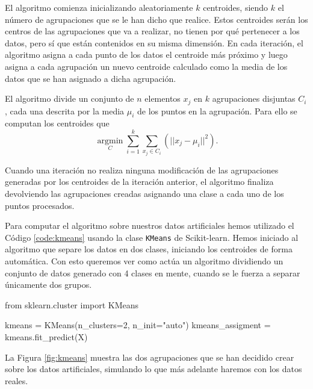 El algoritmo comienza inicializando aleatoriamente $ k $ centroides, siendo $ k $ el número de agrupaciones que se le han dicho que realice. Estos centroides serán los centros de las agrupaciones que va a realizar, no tienen por qué pertenecer a los datos, pero sí que están contenidos en su misma dimensión. En cada iteración, el algoritmo asigna a cada punto de los datos el centroide más próximo y luego asigna a cada agrupación un nuevo centroide calculado como la media de los datos que se han asignado a dicha agrupación.

El algoritmo divide un conjunto de $ n $ elementos $ x_j $ en $ k $ agrupaciones disjuntas $ C_i $, cada una descrita por la media $ \mu_i $ de los puntos en la agrupación. Para ello se computan los centroides que
\begin{equation}
  \underset{C}{\operatorname{arg min}} \sum_{i=1}^k \sum_{x_j \in C_i}  (|| x_j - \mu_i||^2).
\end{equation}

Cuando una iteración no realiza ninguna modificación de las agrupaciones generadas por los centroides de la iteración anterior, el algoritmo finaliza devolviendo las agrupaciones creadas asignando una clase a cada uno de los puntos procesados.

Para computar el algoritmo sobre nuestros datos artificiales hemos utilizado el Código \ref{code:kmeans} usando la clase \texttt{KMeans} de Scikit-learn. Hemos iniciado al algoritmo que separe los datos en dos clases, iniciando los centroides de forma automática. Con esto queremos ver como actúa un algoritmo dividiendo un conjunto de datos generado con 4 clases en mente, cuando se le fuerza a separar únicamente dos grupos.

\begin{mypython}[float={h}, caption={k-medias.}, label={code:kmeans}]
  from sklearn.cluster import KMeans

  kmeans = KMeans(n_clusters=2, n_init="auto")
  kmeans_assigment = kmeans.fit_predict(X)
\end{mypython}

La Figura \ref{fig:kmeans} muestra las dos agrupaciones que se han decidido crear sobre los datos artificiales, simulando lo que más adelante haremos con los datos reales.

